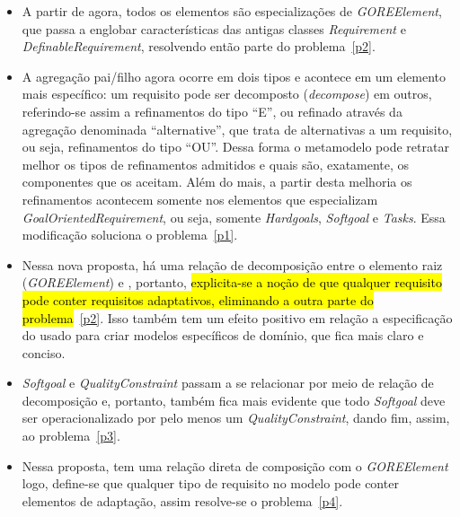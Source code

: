 \begin{itemize}
	\item A partir de agora, todos os elementos são especializações de \textit{GOREElement}, que passa a englobar características das antigas classes \textit{Requirement} e \textit{DefinableRequirement}, resolvendo então parte do problema~\ref{p2}. 

	\item A agregação pai/filho agora ocorre em dois tipos e acontece em um elemento mais específico: um requisito pode ser decomposto (\textit{decompose}) em outros, referindo-se assim a refinamentos do tipo ``E'', ou refinado através da agregação denominada ``alternative'', que trata de alternativas a um requisito, ou seja, refinamentos do tipo ``OU''. Dessa forma o metamodelo pode retratar melhor os tipos de refinamentos admitidos e quais são, exatamente, os componentes que  os aceitam. Além do mais, a partir desta melhoria os refinamentos acontecem somente nos elementos que especializam \textit{GoalOrientedRequirement}, ou seja, somente \textit{Hardgoals}, \textit{Softgoal} e \textit{Tasks}. Essa modificação soluciona o problema~\ref{p1}.

	\item Nessa nova proposta, há uma relação de decomposição entre o elemento raiz (\textit{GOREElement}) e \awreq, portanto, \hl{explicita-se a noção de que qualquer requisito pode conter requisitos adaptativos, eliminando a outra parte do problema}~\ref{p2}. Isso também tem um efeito positivo em relação a especificação do \xml usado para criar modelos específicos de domínio, que fica mais claro e conciso.
	
	\item \textit{Softgoal} e \textit{QualityConstraint} passam a se relacionar por meio de relação de decomposição e, portanto, também fica mais evidente que todo \textit{Softgoal} deve ser operacionalizado por pelo menos um \textit{QualityConstraint}, dando fim, assim, ao problema~\ref{p3}.
	
	
	\item Nessa proposta, \awreqs tem uma relação direta de composição com o \textit{GOREElement} logo, define-se que qualquer tipo de requisito no modelo pode conter elementos de adaptação, assim resolve-se o problema~\ref{p4}.
	

\end{itemize}
